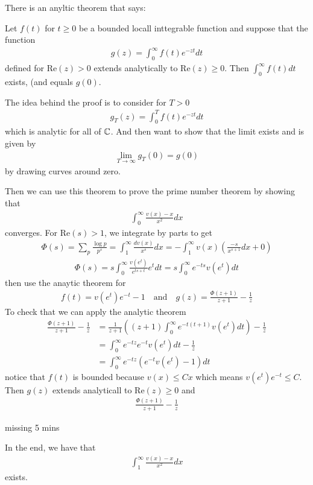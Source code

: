 

There is an anyltic theorem that says:

Let $f(t)$ for $t \geq 0$ be a bounded locall inttegrable function and suppose that the function
\begin{align*}
	g(z) = \int_{0}^{\infty}f(t) e^{-zt}dt
\end{align*}
defined for $\text{Re}(z) > 0$ extends analytically to $\text{Re}(z) \geq 0$.
Then $\int_{0}^{\infty}f(t) dt$ exists, (and equals $g(0)$.

The idea behind the proof is to consider for $T > 0$ 
\begin{align*}
	g_{T}(z) = \int_{0}^{T}f(t) e^{-zt}dt
\end{align*}
which is analytic for all of $\mathbb{C}$. And then want to show that the limit exists and is given by
\begin{align*}
	\lim_{T \to \infty}	g_T(0) = g(0)
\end{align*}
by drawing curves around zero.

Then we can use this theorem to prove the prime number theorem by showing that
\begin{align*}
	\int_{0}^{\infty}\frac{v(x) - x}{x^2}dx
\end{align*}
converges. For $\text{Re}(s) > 1$, we integrate by parts to get
\begin{align*}
	\Phi(s) = \sum_{p} \frac{\log p}{p^{s}} = \int_{1}^{\infty} \frac{dv(x)}{x^s}dx = - \int_{1}^{\infty}v(x) \left(
		\frac{-s}{x^{s+1}}dx + 0
	\right) 
\end{align*}
\begin{align*}
	\Phi(s) = s \int_{0}^{\infty} \frac{v(e^{t})}{e^{ts + t}}e^{t} dt = s \int_{0}^{\infty} e^{-ts}v(e^{t}) dt
\end{align*}
then use the anaytic theorem for
\begin{align*}
	f(t) = v(e^{t})e^{-t} - 1 \quad \text{and} \quad g(z) = \frac{\Phi(z+1)}{z+1} - \frac{1}{z}
\end{align*}
To check that we can apply the analytic theorem
\begin{align*}
	\frac{\Phi(z+1)}{z+1} - \frac{1}{z} &= \frac{1}{z+1} \left(
		(z+1) \int_{0}^{\infty}e^{-t(t+1)}v(e^{t}) dt 
	\right) - \frac{1}{z}\\
																			&= \int_{0}^{\infty}e^{-tz}e^{-t}v(e^{t}) dt - \frac{1}{z}\\
																			&= \int_{0}^{\infty}e^{-tz}(e^{-t}v(e^{t}) - 1) dt
\end{align*}
notice that $f(t)$ is bounded because $v(x) \leq C x$ which means $v(e^{t}) e^{-t} \leq C$.
Then $g(z)$ extends analyticall to $\text{Re}(z) \geq 0$ and
\begin{align*}
	\frac{\Phi(z+1)}{z+1} - \frac{1}{z}
\end{align*}
\begin{center}
	missing 5 mins
\end{center}
In the end, we have that
\begin{align*}
	\int_{1}^{\infty}\frac{v(x) - x}{x^{2}}dx
\end{align*}
exists.



